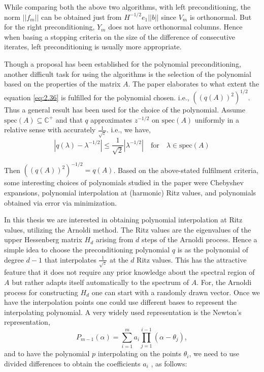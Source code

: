 While comparing both the above two algorithms, with left preconditioning, the norm $||f_{m}||$ can be obtained just from $H^{-1/2}e_{1}||b||$ since $V_{m}$ is orthonormal. But for the right preconditioning, $Y_{m}$ does not have orthonormal columns. Hence when basing a stopping criteria on the size of the difference of consecutive iterates, left preconditioning is usually more appropriate.

Though a proposal has been established for the polynomial preconditioning, another difficult task for using the algorithms is the selection of the polynomial based on the properties of the matrix $A$. The paper \cite{49} elaborates to what extent the equation \ref{eq:2.36} is fulfilled for the polynomial chosen. i.e., $((q(A))^{2})^{1/2}$. Thus a general result has been used for the choice of the polynomial. Assume $\text{spec}(A) \subseteq \mathbb{C}^{+}$ and that $q$ approximates $z^{-1/2}$ on $\text{spec}(A)$ uniformly in a relative sense with accurately $\frac{1}{\sqrt{z}}$. i.e., we have,
\[
    |q(\lambda) - \lambda^{-1/2}| \leq \frac{1}{\sqrt{2}} |\lambda^{-1/2}| \quad \text{for} \quad \lambda \in \text{spec}(A)
\]

Then $((q(A))^{2})^{-1/2} = q(A)$. Based on the above-stated fulfilment criteria, some interesting choices of polynomials studied in the paper were Chebyshev expansions, polynomial interpolation at (harmonic) Ritz values,  and polynomials obtained via error via minimization.

In this thesis we are interested in obtaining polynomial interpolation at Ritz values, utilizing the Arnoldi method. The Ritz values are the eigenvalues of the upper Hessenberg matrix $H_{d}$ arising from $d$ steps of the Arnoldi process. Hence a simple idea to choose the preconditioning polynomial $q$ is as the polynomial of degree $d - 1$ that interpolates $\frac{1}{\sqrt{z}}$ at the $d$ Ritz values. This has the attractive feature that it does not require any prior knowledge about the spectral region of $A$ but rather adapts itself automatically to the spectrum of $A$. For, the Arnoldi process for constructing $H_{d}$ one can start with a randomly drawn vector. Once we have the interpolation points one could use different bases to represent the interpolating polynomial. A very widely used representation is the Newton's representation,
\begin{equation}
    P_{m-1}(\alpha) = \sum_{i=1}^{m} a_i \prod_{j=1}^{i-1} (\alpha - \theta_j),
    \label{eq:2.37}
\end{equation}
and to have the polynomial $p$ interpolating on the points ${\theta_{i} }$, we need to use divided differences to obtain the coefficients $a_{i}$ , as follows:

